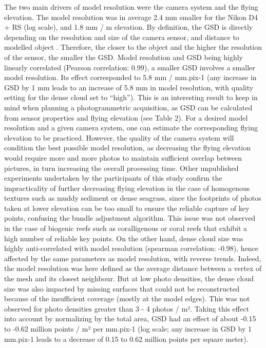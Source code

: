 The two main drivers of model resolution were the camera system and the flying elevation. The model resolution was in average 2.4 mm smaller for the Nikon D4 + RS (log scale), and 1.8 mm / m elevation. By definition, the GSD is directly depending on the resolution and size of the camera sensor, and distance to modelled object \citep{forstner_photogrammetric_2016}. Therefore, the closer to the object and the higher the resolution of the sensor, the smaller the GSD. Model resolution and GSD being highly linearly correlated (Pearson correlation: 0.99), a smaller GSD involves a smaller model resolution. Its effect corresponded to 5.8 mm / mm.pix-1 (any increase in GSD by 1 mm leads to an increase of 5.8 mm in model resolution, with quality setting for the dense cloud set to “high”). This is an interesting result to keep in mind when planning a photogrammetric acquisition, as GSD can be calculated from sensor properties and flying elevation (see Table 2). For a desired model resolution and a given camera system, one can estimate the corresponding flying elevation to be practiced. However, the quality of the camera system will condition the best possible model resolution, as decreasing the flying elevation would require more and more photos to maintain sufficient overlap between pictures, in turn increasing the overall processing time. Other unpublished experiments undertaken by the participants of this study confirm the impracticality of further decreasing flying elevation in the case of homogenous textures such as muddy sediment or dense seagrass, since the footprints of photos taken at lower elevation can be too small to ensure the reliable capture of key points, confusing the bundle adjustment algorithm. This issue was not observed in the case of biogenic reefs such as coralligenous or coral reefs that exhibit a high number of reliable key points.
\medskip
On the other hand, dense cloud size was highly anti-correlated with model resolution (spearman correlation: -0.98), hence affected by the same parameters as model resolution, with reverse trends. Indeed, the model resolution was here defined as the average distance between a vertex of the mesh and its closest neighbour. But at low photo densities, the dense cloud size was also impacted by missing surfaces that could not be reconstructed because of the insufficient coverage (mostly at the model edges). This was not observed for photo densities greater than 3 - 4 photos / m². Taking this effect into account by normalizing by the total area, GSD had an effect of about -0.15 to -0.62 million points / m² per mm.pix-1 (log scale; any increase in GSD by 1 mm.pix-1 leads to a decrease of 0.15 to 0.62 million points per square meter).
